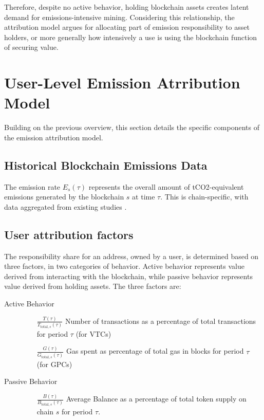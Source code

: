 \documentclass[11pt]{report}
\begin{document}
Therefore, despite no active behavior, holding blockchain assets creates latent demand for emissions-intensive mining. Considering this relationship, the attribution model argues for allocating part of emission responsibility to asset holders, or more generally how intensively a use is using the blockchain function of securing value. 

\section{User-Level Emission Atrribution Model}

Building on the previous overview, this section details the specific components of the emission attribution model.

\subsection{Historical Blockchain Emissions Data}

The emission rate \(E_s(\tau)\) represents the overall amount of tCO2-equivalent emissions generated by the blockchain $s$ at time $\tau$. This is chain-specific, with data aggregated from existing studies \cite{neumuellerCambridgeBitcoinElectricity2021,stollCarbonFootprintBitcoin2019}. 


\subsection{User attribution factors}

The responsibility share for an address, owned by a user, is determined based on three factors, in two categories of behavior. Active behavior represents value derived from interacting with the blockchain, while passive behavior represents value derived from holding assets. The three factors are:

\begin{samepage}
\begin{description}
    \item[Active Behavior] \hfill
    \begin{itemize}
        \item[\( \frac{T(\tau)}{T_{\text{total},s}(\tau)} \)] Number of transactions as a percentage of total transactions for period $\tau$ (for VTCs)
        \item[\( \frac{G(\tau)}{G_{\text{total},s}(\tau)} \)] Gas spent as percentage of total gas in blocks for period $\tau$ (for GPCs)
    \end{itemize}
    \item[Passive Behavior] \hfill
    \begin{itemize}
        \item[\( \frac{B(\tau)}{B_{\text{total},s}(\tau)} \)] Average Balance as a percentage of total token supply on chain $s$ for period $\tau$.
    \end{itemize}
\end{description}
\end{samepage}
\end{document}
